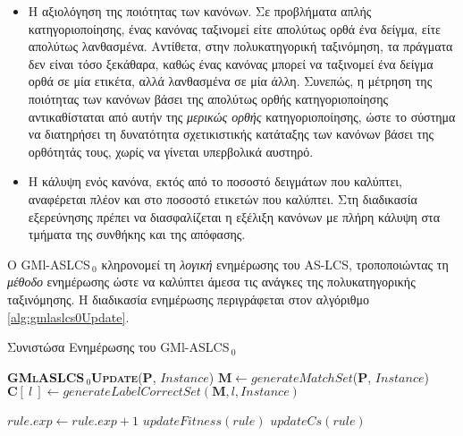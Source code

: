 \begin{itemize}
\item Η αξιολόγηση της ποιότητας των κανόνων. Σε προβλήματα απλής κατηγοριοποίησης, ένας κανόνας ταξινομεί είτε απολύτως ορθά ένα δείγμα, είτε απολύτως λανθασμένα. Αντίθετα, στην πολυκατηγορική ταξινόμηση, τα πράγματα δεν είναι τόσο ξεκάθαρα, καθώς ένας κανόνας μπορεί να ταξινομεί ένα δείγμα ορθά σε μία ετικέτα, αλλά λανθασμένα σε μία άλλη. Συνεπώς, η μέτρηση της ποιότητας των κανόνων βάσει της απολύτως ορθής κατηγοριοποίησης αντικαθίσταται από αυτήν της \emph{μερικώς ορθής} κατηγοριοποίησης, ώστε το σύστημα να διατηρήσει τη δυνατότητα σχετικιστικής κατάταξης των κανόνων βάσει της ορθότητάς τους, χωρίς να γίνεται υπερβολικά αυστηρό.
\item Η κάλυψη ενός κανόνα, εκτός από το ποσοστό δειγμάτων που καλύπτει, αναφέρεται πλέον και στο ποσοστό ετικετών που καλύπτει. Στη διαδικασία εξερεύνησης πρέπει να διασφαλίζεται η εξέλιξη κανόνων με πλήρη κάλυψη στα τμήματα της συνθήκης και της απόφασης.
\end{itemize}
 
Ο GMl-ASLCS$_{\:0}$ κληρονομεί τη \emph{λογική} ενημέρωσης του AS-LCS, τροποποιώντας τη \emph{μέθοδο} ενημέρωσης ώστε να καλύπτει άμεσα τις ανάγκες της πολυκατηγορικής ταξινόμησης. Η διαδικασία ενημέρωσης περιγράφεται στον αλγόριθμο \ref{alg:gmlaslcs0Update}.



\begin{algorithm} 
 \caption{Συνιστώσα Ενημέρωσης του GMl-ASLCS$_{\:0}$}
\label{alg:gmlaslcs0Update}
 \begin{algorithmic}[1]
  \STATE \textbf{\textsc{GMlASLCS$_{\:0}$Update}}($\textbf{P}$, $Instance$)
	  	\STATE $\textbf{M} \gets generateMatchSet$($\textbf{P}$, $Instance$)
			\STATE $\textbf{C}[\:l\:] \gets generateLabelCorrectSet(\textbf{M}, l, Instance)$
		\ENDFOR
		
			\STATE $rule.exp \gets rule.exp + 1$
			\STATE $updateFitness(rule)$
				\STATE $updateCs(rule)$
			\ENDIF
		\ENDFOR	
		
			\ELSE
			\ENDIF
		\ENDFOR
 \end{algorithmic}
\end{algorithm}


